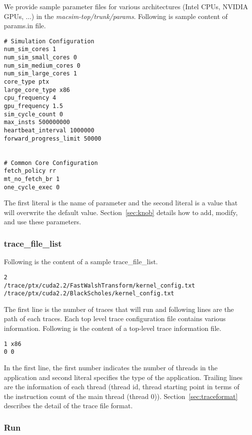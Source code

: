 We provide sample parameter files for various architectures (Intel
CPUs, NVIDIA GPUs, ...) in
the \textit{macsim-top/trunk/params}. Following is sample content of
params.in file.

\smallskip
\begin{lstlisting}
# Simulation Configuration
num_sim_cores 1
num_sim_small_cores 0
num_sim_medium_cores 0
num_sim_large_cores 1
core_type ptx
large_core_type x86
cpu_frequency 4
gpu_frequency 1.5
sim_cycle_count 0
max_insts 500000000
heartbeat_interval 1000000
forward_progress_limit 50000


# Common Core Configuration
fetch_policy rr
mt_no_fetch_br 1
one_cycle_exec 0
\end{lstlisting}
\smallskip

The first literal is the name of parameter and the second literal is a
value that will overwrite the default value. Section~\ref{sec:knob}
details how to add, modify, and use these parameters.


\subsubsection{trace\_file\_list}

Following is the content of a sample trace\_file\_list.

\smallskip
\begin{lstlisting}
2
/trace/ptx/cuda2.2/FastWalshTransform/kernel_config.txt
/trace/ptx/cuda2.2/BlackScholes/kernel_config.txt
\end{lstlisting}
\smallskip

The first line is the number of traces that \SIM will run and
following lines are the path of each traces. Each top level trace
configuration file contains various information. Following is the
content of a top-level trace information file.


\smallskip
\begin{lstlisting}
1 x86
0 0
\end{lstlisting}
\smallskip

In the first line, the first number indicates the number of threads in
the application and second literal specifies the type of the
application. Trailing lines are the information of each thread
({thread id}, {thread starting point in terms of the instruction count
of the main thread (thread 0)}). Section~\ref{sec:traceformat}
describes the detail of the trace file format.



\subsubsection{Run}

